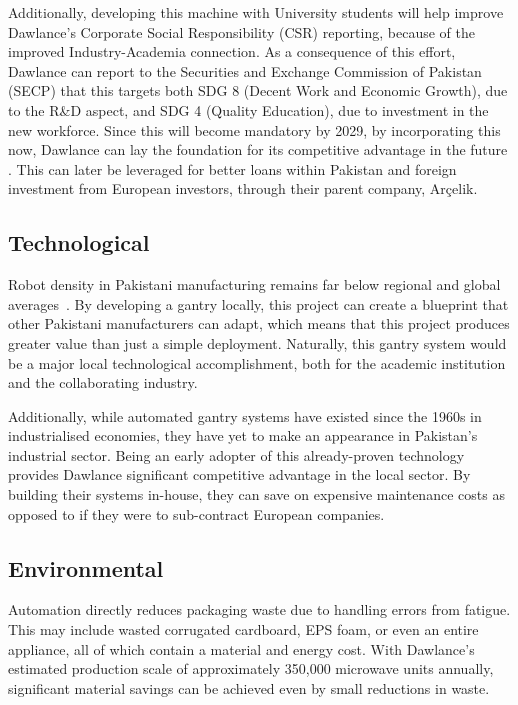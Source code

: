 Additionally, developing this machine with University students will help improve Dawlance's Corporate Social Responsibility (CSR) reporting, because of the improved Industry-Academia connection. As a consequence of this effort, Dawlance can report to the Securities and Exchange Commission of Pakistan (SECP) that this targets both SDG 8 (Decent Work and Economic Growth), due to the R\&D aspect, and SDG 4 (Quality Education), due to investment in the new workforce. Since this will become mandatory by 2029, by incorporating this now, Dawlance can lay the foundation for its competitive advantage in the future \cite{secp_esg}. This can later be leveraged for better loans within Pakistan and foreign investment from European investors, through their parent company, Arçelik.

\subsection{Technological}

Robot density in Pakistani manufacturing remains far below regional and global averages~\cite{ifr2025}. By developing a gantry locally, this project can create a blueprint that other Pakistani manufacturers can adapt, which means that this project produces greater value than just a simple deployment. Naturally, this gantry system would be a major local technological accomplishment, both for the academic institution and the collaborating industry.

Additionally, while automated gantry systems have existed since the 1960s in industrialised economies, they have yet to make an appearance in Pakistan's industrial sector. Being an early adopter of this already-proven technology provides Dawlance significant competitive advantage in the local sector. By building their systems in-house, they can save on expensive maintenance costs as opposed to if they were to sub-contract European companies.

\subsection{Environmental}

Automation directly reduces packaging waste due to handling errors from fatigue. This may include wasted corrugated cardboard, EPS foam, or even an entire appliance, all of which contain a material and energy cost. With Dawlance's estimated production scale of approximately 350,000 microwave units annually, significant material savings can be achieved even by small reductions in waste.

